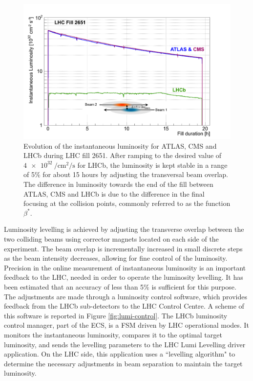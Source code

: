 \begin{figure}
    \centering
    \includegraphics[width=\textwidth]{figures/luminosity_leveling.png}
    \caption{Evolution of the instantaneous luminosity for ATLAS, CMS and LHCb during LHC fill 2651. After ramping to the desired value of $\SI{4e32}{\per\centi\meter\squared\per\second}$ for LHCb, the luminosity is kept stable in a range of 5\% for about 15 hours by adjusting the transversal beam overlap.
    The difference in luminosity towards the end of the fill between ATLAS, CMS and LHCb is due to the difference in the final focusing at the collision points, commonly referred to as the function $\beta^*$.}
    \label{fig:lumi-leveling}
\end{figure}


Luminosity levelling is achieved by adjusting the transverse overlap between the two colliding beams using corrector magnets located on each side of the experiment. The beam overlap is incrementally increased in small discrete steps as the beam intensity decreases, allowing for fine control of the luminosity. Precision in the online measurement of instantaneous luminosity is an important feedback to the LHC, needed in order to operate the luminosity levelling. It has been estimated that an accuracy of less than 5\% is sufficient for this purpose. 
 The adjustments are made through a luminosity control software, which provides feedback from the LHCb sub-detectors to the LHC Control Centre. A scheme of this software is reported in Figure \ref{fig:lumi-control}.
The LHCb luminosity control manager, part of the ECS, is a FSM driven by LHC operational modes. It monitors the instantaneous luminosity, compares it to the optimal target luminosity, and sends the levelling parameters to the LHC Lumi Levelling driver application. On the LHC side, this application uses a ``levelling algorithm" to determine the necessary adjustments in beam separation to maintain the target luminosity.

